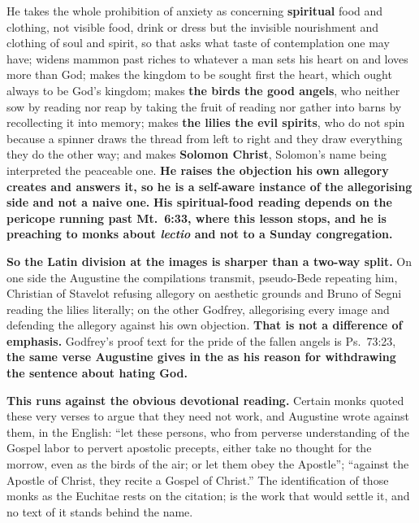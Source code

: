 \begin{witnessnote}
 He
takes the whole prohibition of anxiety as concerning \textbf{spiritual} food and
clothing, not visible food, drink or dress but the invisible nourishment and
clothing of soul and spirit, so that  asks what taste of
contemplation one may have; widens mammon past riches to whatever a man sets his
heart on and loves more than God; makes the kingdom to be
sought first the heart, which ought always to be God's kingdom;
makes \textbf{the birds the good angels}, who neither sow by reading nor reap by
taking the fruit of reading nor gather into barns by recollecting it into
memory; makes \textbf{the lilies the evil spirits}, who do not spin because a
spinner draws the thread from left to right and they draw everything they do the
other way; and makes \textbf{Solomon Christ}, Solomon's name being interpreted
the peaceable one. \textbf{He raises the objection
his own allegory creates and answers it, so he is a self-aware instance of the
allegorising side and not a naive one.} \textbf{His spiritual-food reading depends on
the pericope running past Mt.\ 6:33, where this lesson stops, and he is
preaching to monks about \emph{lectio} and not to a Sunday congregation.}
\end{witnessnote}

\textbf{So the Latin division at the images is sharper than a two-way split.}
On one side the Augustine the compilations transmit, pseudo-Bede repeating him,
Christian of Stavelot refusing allegory on aesthetic grounds and Bruno of Segni
reading the lilies literally; on the other Godfrey, allegorising every image and
defending the allegory against his own objection. \textbf{That is not a
difference of emphasis.} Godfrey's proof text for the pride of the
fallen angels is Ps.~73:23, \textbf{the same verse Augustine gives in the
 as his reason for withdrawing the sentence about hating
God.}

\begin{witnessnote}
 \textbf{This runs against the obvious
devotional reading.} Certain monks quoted these very verses to argue that they
need not work, and Augustine wrote against them, in the  English: ``let these persons, who from
perverse understanding of the Gospel labor to pervert apostolic precepts, either
take no thought for the morrow, even as the birds of the air; or let them obey
the Apostle''; ``against the Apostle of Christ, they recite a Gospel of Christ.'' The
identification of those monks as the Euchitae rests on the
 citation;  is the work that
would settle it, and no text of it stands behind the name.
\end{witnessnote}

